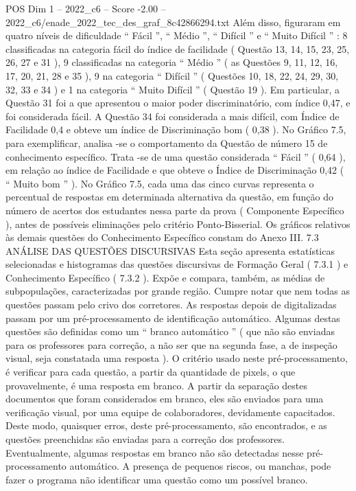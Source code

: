 \begin{textsample}{POS Dim 1 – 2022\_c6 – Score -2.00 – 2022\_c6/enade\_2022\_tec\_des\_graf\_8c42866294.txt}
Além disso, figuraram em quatro níveis de dificuldade “ Fácil ”, “ Médio ”, “ Difícil ” e “ Muito Difícil ” : 8 classificadas na categoria fácil do índice de facilidade ( Questão 13, 14, 15, 23, 25, 26, 27 e 31 ), 9 classificadas na categoria “ Médio ” ( as Questões 9, 11, 12, 16, 17, 20, 21, 28 e 35 ), 9 na categoria “ Difícil ” ( Questões 10, 18, 22, 24, 29, 30, 32, 33 e 34 ) e 1 na categoria “ Muito Difícil ” ( Questão 19 ).
Em particular, a Questão 31 foi a que apresentou o maior poder discriminatório, com índice 0,47, e foi considerada fácil.
A Questão 34 foi considerada a mais difícil, com Índice de Facilidade 0,4 e obteve um índice de Discriminação bom ( 0,38 ).
No Gráfico 7.5, para exemplificar, analisa -se o comportamento da Questão de número 15 de conhecimento específico.
Trata -se de uma questão considerada “ Fácil ” ( 0,64 ), em relação ao índice de Facilidade e que obteve o Índice de Discriminação 0,42 ( “ Muito bom ” ).
No Gráfico 7.5, cada uma das cinco curvas representa o percentual de respostas em determinada alternativa da questão, em função do número de acertos dos estudantes nessa parte da prova ( Componente Específico ), antes de possíveis eliminações pelo critério Ponto-Bisserial.
Os gráficos relativos às demais questões do Conhecimento Específico constam do Anexo III. 7.3 ANÁLISE DAS QUESTÕES DISCURSIVAS Esta seção apresenta estatísticas selecionadas e histogramas das questões discursivas de Formação Geral ( 7.3.1 ) e Conhecimento Específico ( 7.3.2 ).
Expõe e compara, também, as médias de subpopulações, caracterizadas por grande região.
Cumpre notar que nem todas as questões passam pelo crivo dos corretores.
As respostas depois de digitalizadas passam por um pré-processamento de identificação automático.
Algumas destas questões são definidas como um “ branco automático ” ( que não são enviadas para os professores para correção, a não ser que na segunda fase, a de inspeção visual, seja constatada uma resposta ).
O critério usado neste pré-processamento, é verificar para cada questão, a partir da quantidade de pixels, o que provavelmente, é uma resposta em branco.
A partir da separação destes documentos que foram considerados em branco, eles são enviados para uma verificação visual, por uma equipe de colaboradores, devidamente capacitados.
Deste modo, quaisquer erros, deste pré-processamento, são encontrados, e as questões preenchidas são enviadas para a correção dos professores.
Eventualmente, algumas respostas em branco não são detectadas nesse pré-processamento automático.
A presença de pequenos riscos, ou manchas, pode fazer o programa não identificar uma questão como um possível branco.

\end{textsample}
